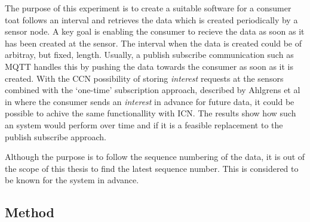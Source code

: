 The purpose of this experiment is to create a suitable software for a consumer toat follows an interval and retrieves the data which is created periodically by a sensor node. A key goal is enabling the consumer to recieve the data as soon as it has been created at the sensor. The interval when the data is created could be of arbitray, but fixed, length.  Usually, a publish subscribe communication such as MQTT handles this by pushing the data towards the consumer as soon as it is created. 
With the CCN possibility of storing \textit{interest} requests at the sensors combined with the `one-time' subscription approach, described by Ahlgrens et al in \cite{Ahlgreniot} where the consumer sends an \textit{interest} in advance for future data, it could be possible to achive the same functionallity with ICN. The results show how such an system would perform over time and if it is a feasible replacement to the publish subscribe approach. 

Although the purpose is to follow the sequence numbering of the data, it is out of the scope of this thesis to find the latest sequence number. This is considered to be known for the system in advance.
\subsection{Method}

